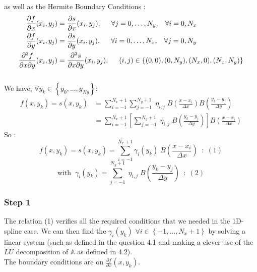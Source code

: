 \documentclass[10pt]{article}
\begin{document}
as well as the Hermite Boundary Conditions :
\begin{align*}
\frac{\partial f}{\partial x}(x_i,y_j) &= \frac{\partial s}{\partial x}(x_i,y_j),  \hspace{5 mm} \forall j = 0,\dots,N_y, \hspace{3 mm} \forall i = 0,N_x \\
\frac{\partial f}{\partial y}(x_i,y_j) &= \frac{\partial s}{\partial y}(x_i,y_j),  \hspace{5 mm} \forall i = 0,\dots,N_x, \hspace{3 mm} \forall j = 0,N_y \\
\frac{\partial ^2 f}{\partial x \partial y}(x_i,y_j) &= \frac{\partial ^2 s}{\partial x \partial y}(x_i,y_j),  \hspace{5 mm} (i,j) \in \left\lbrace (0,0),(0,N_y),(N_x,0),(N_x,N_y) \right\rbrace
\end{align*} \\

We have, $\forall y_k \in \left\lbrace y_0,..., y_{Ny} \right\rbrace$:
\begin{align*}
f(x,y_k) = s(x,y_k) &= \sum_{i=-1}^{N_x+1}   \sum_{j=-1}^{N_y+1} \; \eta_{i,j} \; B(\frac{x-x_i}{\Delta x}) B(\frac{y_k-y_j}{\Delta y})\\
&= \sum_{i=-1}^{N_x+1}  \left[ \sum_{j=-1}^{N_y+1} \; \eta_{i,j} \;  B(\frac{y_k-y_j}{\Delta y}) \right] B(\frac{x-x_i}{\Delta x})
\end{align*}
So :
$$\boxed{f(x,y_k) = s(x,y_k) = \sum_{i=-1}^{N_x+1} \gamma _i (y_k) \;    B(\frac{x-x_i}{\Delta x}) \;\;:\; (1)}$$
 $$ \mathrm{with} \;\; \boxed{\gamma _i (y_k) = \sum_{j=-1}^{N_y+1} \; \eta_{i,j} \;  B(\frac{y_k-y_j}{\Delta y}) \;\; : \; (2)}$$


\subsubsection{Step 1}


The relation (1) verifies all the required conditions that we needed in the 1D-spline case. We can then find the $\gamma_i (y_k)$ $\forall i \in \left\lbrace -1,...,N_x+1 \right\rbrace$ by solving a linear system (such as defined in the question 4.1 and making a clever use of the $LU$ decomposition of $\mathbb{A}$ as defined in 4.2).\\

The boundary conditions are on $\frac{\partial f}{\partial x}(x,y_k)$.\\
\end{document}
